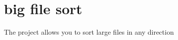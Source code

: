 \chapter{big file sort}
\hypertarget{index}{}\label{index}
The project allows you to sort large files in any direction 